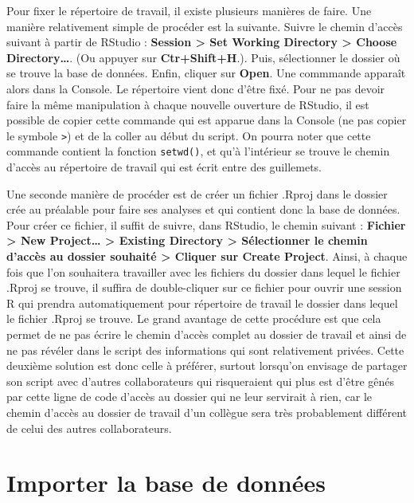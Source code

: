 \documentclass[
  french,
]{book}
\begin{document}
Pour fixer le répertoire de travail, il existe plusieurs manières de faire. Une manière relativement simple de procéder est la suivante. Suivre le chemin d'accès suivant à partir de RStudio : \textbf{Session \textgreater{} Set Working Directory \textgreater{} Choose Directory\ldots{}}. (Ou appuyer sur \textbf{Ctr+Shift+H}.). Puis, sélectionner le dossier où se trouve la base de données. Enfin, cliquer sur \textbf{Open}. Une commmande apparaît alors dans la Console. Le répertoire vient donc d'être fixé. Pour ne pas devoir faire la même manipulation à chaque nouvelle ouverture de RStudio, il est possible de copier cette commande qui est apparue dans la Console (ne pas copier le symbole \texttt{\textgreater{}}) et de la coller au début du script. On pourra noter que cette commande contient la fonction \texttt{setwd()}, et qu'à l'intérieur se trouve le chemin d'accès au répertoire de travail qui est écrit entre des guillemets.

Une seconde manière de procéder est de créer un fichier .Rproj dans le dossier crée au préalable pour faire ses analyses et qui contient donc la base de données. Pour créer ce fichier, il suffit de suivre, dans RStudio, le chemin suivant : \textbf{Fichier \textgreater{} New Project\ldots{} \textgreater{} Existing Directory \textgreater{} Sélectionner le chemin d'accès au dossier souhaité \textgreater{} Cliquer sur Create Project}. Ainsi, à chaque fois que l'on souhaitera travailler avec les fichiers du dossier dans lequel le fichier .Rproj se trouve, il suffira de double-cliquer sur ce fichier pour ouvrir une session R qui prendra automatiquement pour répertoire de travail le dossier dans lequel le fichier .Rproj se trouve. Le grand avantage de cette procédure est que cela permet de ne pas écrire le chemin d'accès complet au dossier de travail et ainsi de ne pas révéler dans le script des informations qui sont relativement privées. Cette deuxième solution est donc celle à préférer, surtout lorsqu'on envisage de partager son script avec d'autres collaborateurs qui risqueraient qui plus est d'être gênés par cette ligne de code d'accès au dossier qui ne leur servirait à rien, car le chemin d'accès au dossier de travail d'un collègue sera très probablement différent de celui des autres collaborateurs.

\hypertarget{importer-la-base-de-donnuxe9es}{%
\section{Importer la base de données}\label{importer-la-base-de-donnuxe9es}}
\end{document}
